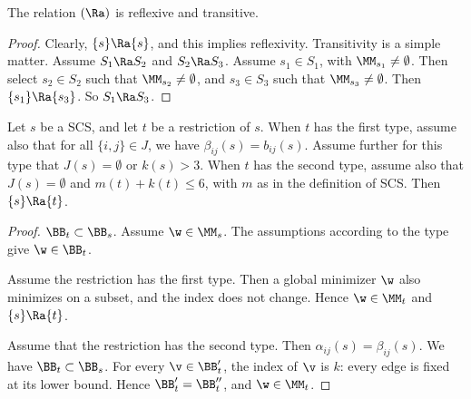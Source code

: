 \begin{lemma}
The relation $(\Ra)$  is reflexive and transitive.
\end{lemma}

\begin{proof}  Clearly, $\{s \}\Ra \{s\}$, and this implies reflexivity.
Transitivity is a simple matter.  Assume
$S_1\Ra S_2$ and $S_2\Ra S_3$.  Assume $s_1\in S_1$, with $\MM_{s_1}\ne \emptyset$.
Then select
$s_2\in S_2$ such that $\MM_{s_2}\ne\emptyset$, and $s_3\in S_3$ such
that $\MM_{s_3}\ne\emptyset$.  Then $\{s_1\}\Ra\{s_3\}$.  So $S_1\Ra S_3$.
\end{proof}



\begin{lemma}[restriction]
Let $s$ be a SCS, and let $t$ be a restriction of $s$.
When $t$ has the first type, assume also that for all $\{ i , j\} \in J$, we have $\beta_{i j}(s) = b_{i j}(s)$.
Assume further for this type that $J(s)=\emptyset$ or $k(s)>3$.
When $t$ has the second type, assume also that $J(s)=\emptyset$ and $m(t)+k(t)\le 6$, with $m$ as in
the definition of SCS.
Then $\{s\}\Ra \{t\}$.
\end{lemma}

\begin{proof}
$\BB_t\subset \BB_s$. Assume
 $\w\in \MM_s$. The assumptions  according to the type give $\w\in \BB_t$.

Assume the restriction has the first type.  Then a global minimizer $\w$ also
minimizes on a subset,  and the index does not change.  Hence $\w\in \MM_t$ and $\{s\}\Ra\{t\}$.

Assume that the restriction has the second type. Then 
 $\alpha_{ij}(s)=\beta_{ij}(s)$.    We have $\BB_t\subset \BB_s$.
For every $\v\in \BB'_t$, the index of $\v$ is $k$: every edge is fixed at its lower bound.
Hence $\BB'_t = \BB''_t$, and $\w\in \MM_t$.
\end{proof}


